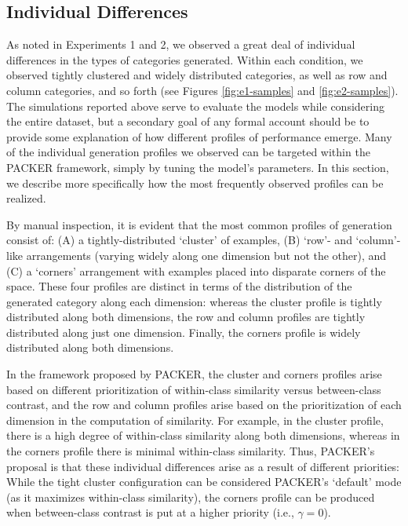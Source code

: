 \documentclass[12pt]{article}
\begin{document}
\begin{flushleft}
\subsection{Individual Differences}
\label{section:individual-diffs}

As noted in Experiments 1 and 2, we observed a great deal of individual differences in the types of categories generated. Within each condition, we observed tightly clustered and widely distributed categories, as well as row and column categories, and so forth (see Figures \ref{fig:e1-samples} and \ref{fig:e2-samples}). The simulations reported above serve to evaluate the models while considering the entire dataset, but a secondary goal of any formal account should be to provide some explanation of how different profiles of performance emerge. Many of the individual generation profiles we observed can be targeted within the PACKER framework, simply by tuning the model's parameters. In this section, we describe more specifically how the most frequently observed profiles can be realized.

By manual inspection, it is evident that the most common profiles of generation consist of: (A) a tightly-distributed `cluster' of examples, (B) `row'- and `column'-like arrangements (varying widely along one dimension but not the other), and (C) a `corners' arrangement with examples placed into disparate corners of the space. These four profiles are distinct in terms of the distribution of the generated category along each dimension: whereas the cluster profile is tightly distributed along both dimensions, the row and column profiles are tightly distributed along just one dimension. Finally, the corners profile is widely distributed along both dimensions.

In the framework proposed by PACKER, the cluster and corners profiles arise based on different prioritization of within-class similarity versus between-class contrast, and the row and column profiles arise based on the prioritization of each dimension in the computation of similarity. For example, in the cluster profile, there is a high degree of within-class similarity along both dimensions, whereas in the corners profile there is minimal within-class similarity. Thus, PACKER's proposal is that these individual differences arise as a result of different priorities: While the tight cluster configuration can be considered PACKER's `default' mode (as it maximizes within-class similarity), the corners profile can be produced when between-class contrast is put at a higher priority (i.e., $\gamma = 0$).


\end{flushleft}
\end{document}
